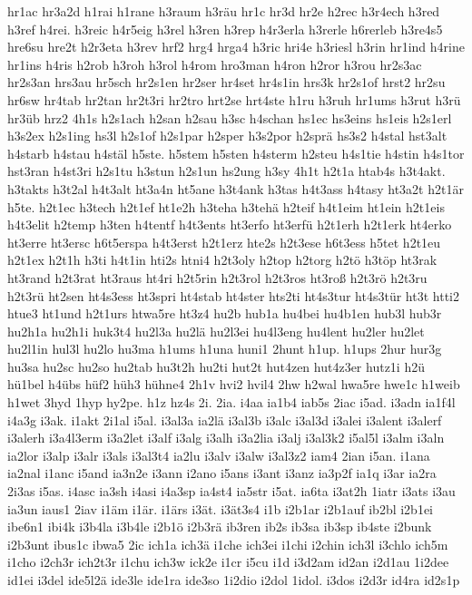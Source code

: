 {hr1ac
hr3a2d
h1rai
h1rane
h3raum
h3räu
hr1c
hr3d
hr2e
h2rec
h3r4ech
h3red
h3ref
h4rei.
h3reic
h4r5eig
h3rel
h3ren
h3rep
h4r3erla
h3rerle
h6rerleb
h3re4s5
hre6su
hre2t
h2r3eta
h3rev
hrf2
hrg4
hrga4
h3ric
hri4e
h3riesl
h3rin
hr1ind
h4rine
hr1ins
h4ris
h2rob
h3roh
h3rol
h4rom
hro3man
h4ron
h2ror
h3rou
hr2s3ac
hr2s3an
hrs3au
hr5sch
hr2s1en
hr2ser
hr4set
hr4s1in
hrs3k
hr2s1of
hrst2
hr2su
hr6sw
hr4tab
hr2tan
hr2t3ri
hr2tro
hrt2se
hrt4ste
h1ru
h3ruh
hr1ums
h3rut
h3rü
hr3üb
hrz2
4h1s
h2s1ach
h2san
h2sau
h3sc
h4schan
hs1ec
hs3eins
hs1eis
h2s1erl
h3s2ex
h2s1ing
hs3l
h2s1of
h2s1par
h2sper
h3s2por
h2sprä
hs3s2
h4stal
hst3alt
h4starb
h4stau
h4stäl
h5ste.
h5stem
h5sten
h4sterm
h2steu
h4s1tie
h4stin
h4s1tor
hst3ran
h4st3ri
h2s1tu
h3stun
h2s1un
hs2ung
h3sy
4h1t
h2t1a
htab4s
h3t4akt.
h3takts
h3t2al
h4t3alt
ht3a4n
ht5ane
h3t4ank
h3tas
h4t3ass
h4tasy
ht3a2t
h2t1är
h5te.
h2t1ec
h3tech
h2t1ef
ht1e2h
h3teha
h3tehä
h2teif
h4t1eim
ht1ein
h2t1eis
h4t3elit
h2temp
h3ten
h4tentf
h4t3ents
ht3erfo
ht3erfü
h2t1erh
h2t1erk
ht4erko
ht3erre
ht3ersc
h6t5erspa
h4t3erst
h2t1erz
hte2s
h2t3ese
h6t3ess
h5tet
h2t1eu
h2t1ex
h2t1h
h3ti
h4t1in
hti2s
htni4
h2t3oly
h2top
h2torg
h2tö
h3töp
ht3rak
ht3rand
h2t3rat
ht3raus
ht4ri
h2t5rin
h2t3rol
h2t3ros
ht3roß
h2t3rö
h2t3ru
h2t3rü
ht2sen
ht4s3ess
ht3spri
ht4stab
ht4ster
hts2ti
ht4s3tur
ht4s3tür
ht3t
htti2
htue3
ht1und
h2t1urs
htwa5re
ht3z4
hu2b
hub1a
hu4bei
hu4b1en
hub3l
hub3r
hu2h1a
hu2h1i
huk3t4
hu2l3a
hu2lä
hu2l3ei
hu4l3eng
hu4lent
hu2ler
hu2let
hu2l1in
hul3l
hu2lo
hu3ma
h1ums
h1una
huni1
2hunt
h1up.
h1ups
2hur
hur3g
hu3sa
hu2sc
hu2so
hu2tab
hu3t2h
hu2ti
hut2t
hut4zen
hut4z3er
hutz1i
h2ü
hü1bel
h4übs
hüf2
hüh3
hühne4
2h1v
hvi2
hvil4
2hw
h2wal
hwa5re
hwe1c
h1weib
h1wet
3hyd
1hyp
hy2pe.
h1z
hz4s
2i.
2ia.
i4aa
ia1b4
iab5s
2iac
i5ad.
i3adn
ia1f4l
i4a3g
i3ak.
i1akt
2i1al
i5al.
i3al3a
ia2lä
i3al3b
i3alc
i3al3d
i3alei
i3alent
i3alerf
i3alerh
i3a4l3erm
i3a2let
i3alf
i3alg
i3alh
i3a2lia
i3alj
i3al3k2
i5al5l
i3alm
i3aln
ia2lor
i3alp
i3alr
i3als
i3al3t4
ia2lu
i3alv
i3alw
i3al3z2
iam4
2ian
i5an.
i1ana
ia2nal
i1anc
i5and
ia3n2e
i3ann
i2ano
i5ans
i3ant
i3anz
ia3p2f
ia1q
i3ar
ia2ra
2i3as
i5as.
i4asc
ia3sh
i4asi
i4a3sp
ia4st4
ia5str
i5at.
ia6ta
i3at2h
1iatr
i3ats
i3au
ia3un
iaus1
2iav
i1äm
i1är.
i1ärs
i3ät.
i3ät3s4
i1b
i2b1ar
i2b1auf
ib2bl
i2b1ei
ibe6n1
ibi4k
i3b4la
i3b4le
i2b1ö
i2b3rä
ib3ren
ib2s
ib3sa
ib3sp
ib4ste
i2bunk
i2b3unt
ibus1c
ibwa5
2ic
ich1a
ich3ä
i1che
ich3ei
i1chi
i2chin
ich3l
i3chlo
ich5m
i1cho
i2ch3r
ich2t3r
i1chu
ich3w
ick2e
i1cr
i5cu
i1d
i3d2am
id2an
i2d1au
1i2dee
id1ei
i3del
ide5l2ä
ide3le
ide1ra
ide3so
1i2dio
i2dol
1idol.
i3dos
i2d3r
id4ra
id2s1p
}
